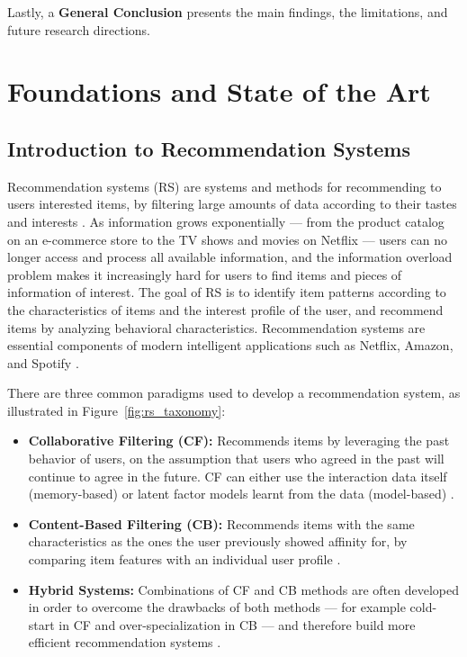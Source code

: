 \documentclass[12pt,a4paper]{report}
\begin{document}
Lastly, a \textbf{General Conclusion} presents the main findings, the
limitations, and future research directions.


\chapter{Foundations and State of the Art}

\section{Introduction to Recommendation Systems}

Recommendation systems (RS) are systems and methods for recommending to users
interested items, by filtering large amounts of data according to their tastes
and interests \citep{castells2023primer}. As information grows exponentially ---
from the product catalog on an e-commerce store to the TV shows and movies on
Netflix --- users can no longer access and process all available information,
and the information overload problem makes it increasingly hard for users to
find items and pieces of information of interest. The goal of RS is to identify
item patterns according to the characteristics of items and the interest profile
of the user, and recommend items by analyzing behavioral characteristics.
Recommendation systems are essential components of modern intelligent
applications such as Netflix, Amazon, and Spotify \citep{raza2024comprehensive}.

There are three common paradigms used to develop a recommendation system, as
illustrated in Figure~\ref{fig:rs_taxonomy}:

\begin{itemize}
    \item \textbf{Collaborative Filtering (CF):} Recommends items by
    leveraging the past behavior of users, on the assumption that users who
    agreed in the past will continue to agree in the future. CF can either
    use the interaction data itself (memory-based) or latent factor models
    learnt from the data (model-based) \citep{castells2023primer}.

    \item \textbf{Content-Based Filtering (CB):} Recommends items with the
    same characteristics as the ones the user previously showed affinity for,
    by comparing item features with an individual user profile
    \citep{raza2024comprehensive}.

    \item \textbf{Hybrid Systems:} Combinations of CF and CB methods are often
    developed in order to overcome the drawbacks of both methods --- for
    example cold-start in CF and over-specialization in CB --- and therefore
    build more efficient recommendation systems \citep{raza2024comprehensive}.
\end{itemize}
\end{document}
